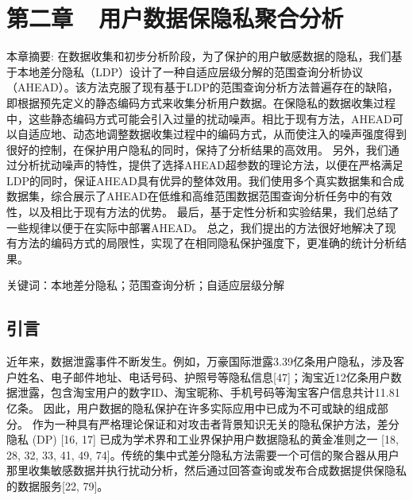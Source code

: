 \chapter{第二章~~用户数据保隐私聚合分析}
本章摘要: 
在数据收集和初步分析阶段，为了保护的用户敏感数据的隐私，我们基于本地差分隐私（LDP）设计了一种自适应层级分解的范围查询分析协议（AHEAD）。该方法克服了现有基于LDP的范围查询分析方法普遍存在的缺陷，即根据预先定义的静态编码方式来收集分析用户数据。在保隐私的数据收集过程中，这些静态编码方式可能会引入过量的扰动噪声。相比于现有方法，AHEAD可以自适应地、动态地调整数据收集过程中的编码方式，从而使注入的噪声强度得到很好的控制，在保护用户隐私的同时，保持了分析结果的高效用。
另外，我们通过分析扰动噪声的特性，提供了选择AHEAD超参数的理论方法，以便在严格满足LDP的同时，保证AHEAD具有优异的整体效用。我们使用多个真实数据集和合成数据集，综合展示了AHEAD在低维和高维范围数据范围查询分析任务中的有效性，以及相比于现有方法的优势。
最后，基于定性分析和实验结果，我们总结了一些规律以便于在实际中部署AHEAD。
总之，我们提出的方法很好地解决了现有方法的编码方式的局限性，实现了在相同隐私保护强度下，更准确的统计分析结果。

关键词：本地差分隐私；范围查询分析；自适应层级分解

\section{引言}
近年来，数据泄露事件不断发生。例如，万豪国际泄露3.39亿条用户隐私，涉及客户姓名、电子邮件地址、电话号码、护照号等隐私信息[47]；淘宝近12亿条用户数据泄露，包含淘宝用户的数字ID、淘宝昵称、手机号码等淘宝客户信息共计11.81亿条。 
因此，用户数据的隐私保护在许多实际应用中已成为不可或缺的组成部分。
作为一种具有严格理论保证和对攻击者背景知识无关的隐私保护方法，差分隐私 (DP) [16, 17] 已成为学术界和工业界保护用户数据隐私的黄金准则之一 [18, 28, 32, 33, 41, 49, 74]。传统的集中式差分隐私方法需要一个可信的聚合器从用户那里收集敏感数据并执行扰动分析，然后通过回答查询或发布合成数据提供保隐私的数据服务[22, 79]。

